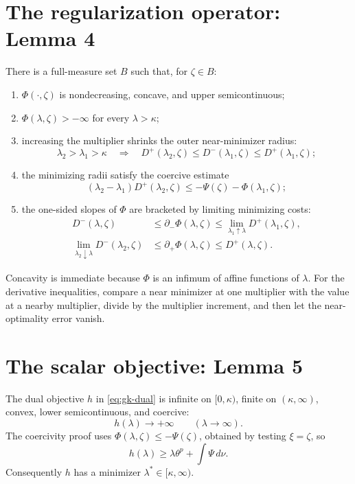 \section{The regularization operator: Lemma 4}
There is a full-measure set \(B\) such that, for \(\zeta\in B\):
\begin{enumerate}[leftmargin=2em,label=(\roman*)]
\item \(\Phi(\cdot,\zeta)\) is nondecreasing, concave, and upper semicontinuous;
\item \(\Phi(\lambda,\zeta)>-\infty\) for every \(\lambda>\kappa\);
\item increasing the multiplier shrinks the outer near-minimizer radius:
\[
 \lambda_2>\lambda_1>\kappa
 \quad\Longrightarrow\quad
 D^+(\lambda_2,\zeta)\le D^-(\lambda_1,\zeta)
 \le D^+(\lambda_1,\zeta);
\]
\item the minimizing radii satisfy the coercive estimate
\begin{equation}\label{eq:gk-radius-bound}
 (\lambda_2-\lambda_1)D^+(\lambda_2,\zeta)
 \le -\Psi(\zeta)-\Phi(\lambda_1,\zeta);
\end{equation}
\item the one-sided slopes of \(\Phi\) are bracketed by limiting minimizing costs:
\begin{align}
 D^-(\lambda,\zeta)
 &\le \partial_-\Phi(\lambda,\zeta)
 \le \lim_{\lambda_1\uparrow\lambda}D^+(\lambda_1,\zeta),\label{eq:gk-left-slope}\\
 \lim_{\lambda_2\downarrow\lambda}D^-(\lambda_2,\zeta)
 &\le \partial_+\Phi(\lambda,\zeta)
 \le D^+(\lambda,\zeta).\label{eq:gk-right-slope}
\end{align}
\end{enumerate}
Concavity is immediate because \(\Phi\) is an infimum of affine functions of \(\lambda\).
For the derivative inequalities, compare a near minimizer at one multiplier with the value at a
nearby multiplier, divide by the multiplier increment, and then let the near-optimality error vanish.

\section{The scalar objective: Lemma 5}
The dual objective \(h\) in \eqref{eq:gk-dual} is infinite on \([0,\kappa)\), finite on
\((\kappa,\infty)\), convex, lower semicontinuous, and coercive:
\[
 h(\lambda)\longrightarrow+\infty\qquad(\lambda\to\infty).
\]
The coercivity proof uses \(\Phi(\lambda,\zeta)\le -\Psi(\zeta)\), obtained by testing
\(\xi=\zeta\), so
\[
 h(\lambda)\ge \lambda\theta^p+\int\Psi\,d\nu.
\]
Consequently \(h\) has a minimizer \(\lambda^*\in[\kappa,\infty)\).

